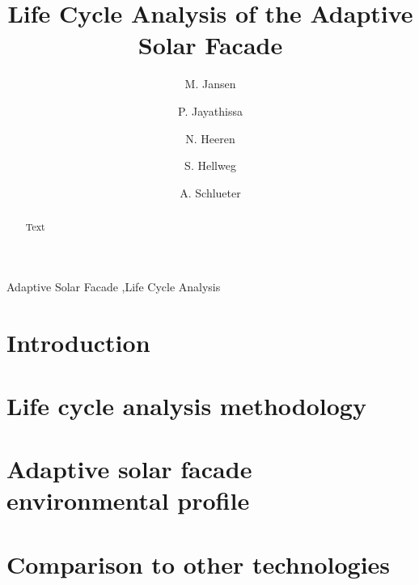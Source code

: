 \documentclass[preprint,12pt]{elsarticle}
\begin{document}
\begin{frontmatter}

\title{Life Cycle Analysis of the Adaptive Solar Facade} 

\author[ita]{M. Jansen}

\author[ita]{P. Jayathissa}

\author[baug]{N. Heeren}

\author[baug]{S. Hellweg}

\author[ita]{A. Schlueter}



\address[ita]{Architecture and Building Systems, Institute of Technology in Architecture,\\ ETH Zurich, Switzerland} 
\address[baug]{Ecological System Design, Institute of Environmental Engineering,\\ ETH Zurich, Switzerland}

\begin{abstract}
Text 
\end{abstract}

\begin{keyword}
Adaptive Solar Facade \sep Life Cycle Analysis
\end{keyword}

\end{frontmatter}

\section{Introduction}
\label{introduction}


\section{Life cycle analysis methodology}
\label{method}


\section{Adaptive solar facade environmental profile}
\label{profile}


\section{Comparison to other technologies}
\label{comparison}

\end{document}
